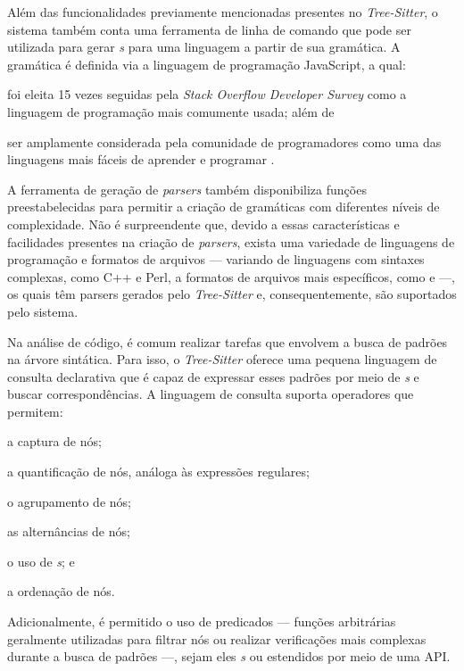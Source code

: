 \documentclass
  [11pt,a4paper,english,brazil,openright,sumario=tradicional,twoside]
  {abntex2}
\newcommand{\treesitter}{\textit{Tree-Sitter}\xspace}
\begin{document}
  Além das funcionalidades previamente mencionadas presentes no \treesitter, o
  sistema também conta uma ferramenta de linha de comando que pode ser
  utilizada para gerar \textit{s} para uma linguagem a partir de
  sua gramática. A gramática é definida via a linguagem de programação
  JavaScript, a qual:
  \begin{inparaenum}
    \item foi eleita 15 vezes seguidas pela
          \textit{Stack Overflow Developer Survey}
          \cite{stack-overflow-2022-stack} como a linguagem de programação mais
          comumente usada; além de
    \item ser amplamente considerada pela comunidade de programadores como uma
          das linguagens mais fáceis de aprender e programar
          \cites{berkeley-2023-11}{goel-2023-how}{w3schools-2023-javascript}.
  \end{inparaenum}
  A ferramenta de geração de \textit{parsers} também disponibiliza funções
  preestabelecidas para permitir a criação de gramáticas com diferentes níveis
  de complexidade. Não é surpreendente que, devido a essas características e
  facilidades presentes na criação de \textit{parsers}, exista uma variedade de
  linguagens de programação e formatos de arquivos --- variando de linguagens
  com sintaxes complexas, como C++ e Perl, a formatos de arquivos mais
  específicos, como  e  ---,
  os quais têm parsers gerados pelo \treesitter e, consequentemente, são
  suportados pelo sistema.

  Na análise de código, é comum realizar tarefas que envolvem a busca de
  padrões na árvore sintática. Para isso, o \treesitter oferece uma pequena
  linguagem de consulta declarativa que é capaz de expressar esses padrões por
  meio de \textit{s} e buscar correspondências. A linguagem
  de consulta suporta operadores que permitem:
  \begin{inparaenum}
    \item a captura de nós;
    \item a quantificação de nós, análoga às expressões regulares;
    \item o agrupamento de nós;
    \item as alternâncias de nós;
    \item o uso de \textit{s}; e
    \item a ordenação de nós.
  \end{inparaenum}
  Adicionalmente, é permitido o uso de predicados --- funções arbitrárias
  geralmente utilizadas para filtrar nós ou realizar verificações mais
  complexas durante a busca de padrões ---, sejam eles
  \textit{s} ou estendidos por meio de uma API.
\end{document}
